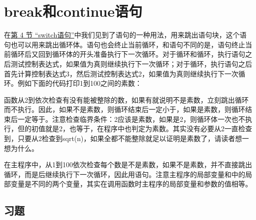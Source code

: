 
\section{break和continue语句}
%
在\hyperlink{db.ch04s04.id2719538}{第 4 节 “switch语句”}中我们见到了语句的一种用法，用来跳出语句块，这个语句也可以用来跳出循环体。语句也会终止当前循环，和语句不同的是，语句终止当前循环后又回到循环体的开头准备执行下一次循环。对于循环和循环，执行语句之后测试控制表达式，如果值为真则继续执行下一次循环；对于循环，执行语句之后首先计算控制表达式3，然后测试控制表达式2，如果值为真则继续执行下一次循环。例如下面的代码打印1到100之间的素数：





函数从2到依次检查有没有能被整除的数，如果有就说明不是素数，立刻跳出循环而不执行。因此，如果不是素数，则循环结束后一定小于，如果是素数，则循环结束后一定等于。注意检查临界条件：2应该是素数，如果是2，则循环体一次也不执行，但的初值就是2，也等于，在程序中也判定为素数。其实没有必要从2一直检查到，只要从2检查到sqrt(n)，如果全都不能整除就足以证明是素数了，请读者想一想为什么。



在主程序中，从1到100依次检查每个数是不是素数，如果不是素数，并不直接跳出循环，而是后继续执行下一次循环，因此用语句。注意主程序的局部变量和中的局部变量是不同的两个变量，其实在调用函数时主程序的局部变量和参数的值相等。


\subsection*{习题}
%


